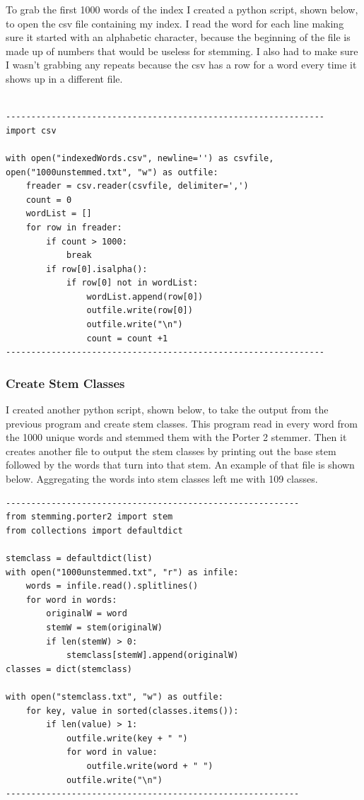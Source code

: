 \documentclass[letterpaper,12pt]{article}
\begin{document}
To grab the first 1000 words of the index I created a python script, shown below, to open the csv file containing my index. I read the word for each line making sure it started with an alphabetic character, because the beginning of the file is made up of numbers that would be useless for stemming. I also had to make sure I wasn't grabbing any repeats because the csv has a row for a word every time it shows up in a different file.

\begin{lstlisting}[breaklines]

---------------------------------------------------------------
import csv

with open("indexedWords.csv", newline='') as csvfile, open("1000unstemmed.txt", "w") as outfile:
    freader = csv.reader(csvfile, delimiter=',')
    count = 0
    wordList = []
    for row in freader:
        if count > 1000:
            break
        if row[0].isalpha():
            if row[0] not in wordList:
                wordList.append(row[0])
                outfile.write(row[0])
                outfile.write("\n")
                count = count +1
---------------------------------------------------------------
\end{lstlisting}

\subsubsection{Create Stem Classes}

I created another python script, shown below, to take the output from the previous program and create stem classes. This program read in every word from the 1000 unique words and stemmed them with the Porter 2 stemmer. Then it creates another file to output the stem classes by printing out the base stem followed by the words that turn into that stem. An example of that file is shown below. Aggregating the words into stem classes left me with 109 classes.

\begin{lstlisting}[breaklines]
----------------------------------------------------------
from stemming.porter2 import stem
from collections import defaultdict

stemclass = defaultdict(list)
with open("1000unstemmed.txt", "r") as infile:
    words = infile.read().splitlines()
    for word in words:
        originalW = word
        stemW = stem(originalW)
        if len(stemW) > 0:
            stemclass[stemW].append(originalW)
classes = dict(stemclass)

with open("stemclass.txt", "w") as outfile:
    for key, value in sorted(classes.items()):
        if len(value) > 1:
            outfile.write(key + " ")
            for word in value:
                outfile.write(word + " ")
            outfile.write("\n")
----------------------------------------------------------
\end{lstlisting}
\end{document}
